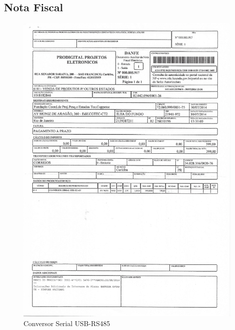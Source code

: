\subsection{Nota Fiscal}
\begin{figure}[H]
 \centering
 \includegraphics[width=0.9\columnwidth]{Conversor/nota_conversor.pdf}
 \caption{Conversor Serial USB-RS485}
 \end{figure}